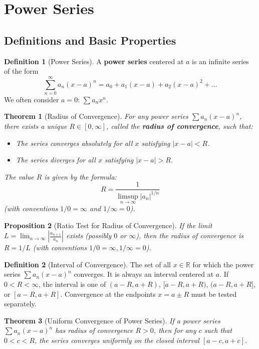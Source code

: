\documentclass{article}
\theoremstyle{definition}
\newtheorem{definition}{Definition}[section]
\theoremstyle{plain}
\newtheorem{theorem}{Theorem}[section]
\newtheorem{prop}[theorem]{Proposition}
\theoremstyle{remark}
\newcommand{\R}{\mathbb{R}}
\begin{document}
\section{Power Series}

\subsection{Definitions and Basic Properties}

\begin{definition}[Power Series{\cite[Sec 23]{Ross}}]
A \textbf{power series} centered at \(a\) is an infinite series of the form
\[ \sum_{n=0}^\infty a_n (x-a)^n = a_0 + a_1(x-a) + a_2(x-a)^2 + \dots \]
We often consider \(a=0\): \(\sum a_n x^n\).
\end{definition}

\begin{theorem}[Radius of Convergence{\cite[Thm 23.1]{Ross}}]
For any power series \(\sum a_n (x-a)^n\), there exists a unique \(R \in [0, \infty]\), called the \textbf{radius of convergence}, such that:
\begin{itemize}
    \item The series converges absolutely for all \(x\) satisfying \(|x-a| < R\).
    \item The series diverges for all \(x\) satisfying \(|x-a| > R\).
\end{itemize}
The value \(R\) is given by the formula:
\[ R = \frac{1}{\limsup_{n\to\infty} |a_n|^{1/n}} \]
(with conventions \(1/0=\infty\) and \(1/\infty=0\)).
\end{theorem}

\begin{prop}[Ratio Test for Radius of Convergence{\cite[Sec 9]{Ross}}]
If the limit \(L = \lim_{n\to\infty} \left| \frac{a_{n+1}}{a_n} \right|\) exists (possibly \(0\) or \(\infty\)), then the radius of convergence is \(R = 1/L\) (with conventions \(1/0=\infty, 1/\infty=0\)).
\end{prop}

\begin{definition}[Interval of Convergence]
The set of all \(x \in \R\) for which the power series \(\sum a_n (x-a)^n\) converges. It is always an interval centered at \(a\). If \(0 < R < \infty\), the interval is one of \((a-R, a+R)\), \([a-R, a+R)\), \((a-R, a+R]\), or \([a-R, a+R]\). Convergence at the endpoints \(x=a\pm R\) must be tested separately.
\end{definition}

\begin{theorem}[Uniform Convergence of Power Series{\cite[Thm 26.1]{Ross}}]
If a power series \(\sum a_n (x-a)^n\) has radius of convergence \(R > 0\), then for any \(c\) such that \(0 < c < R\), the series converges uniformly on the closed interval \([a-c, a+c]\).
\end{theorem}
\end{document}
